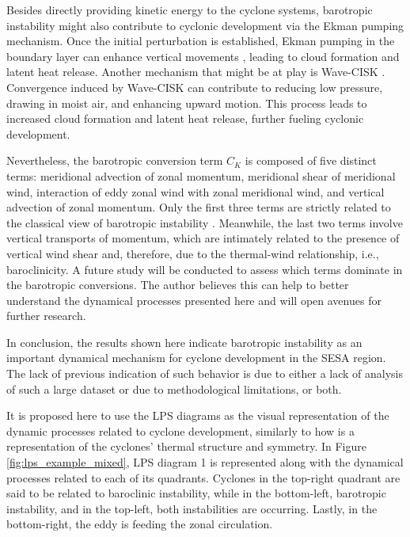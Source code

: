 Besides directly providing kinetic energy to the cyclone systems, barotropic instability might also contribute to cyclonic development via the Ekman pumping mechanism. Once the initial perturbation is established, Ekman pumping in the boundary layer can enhance vertical movements \citep[e.g.]{hamouda2019ekman}, leading to cloud formation and latent heat release. Another mechanism that might be at play is Wave-CISK \citep{lindzen1974wave,raymond1976wave}. Convergence induced by Wave-CISK can contribute to reducing low pressure, drawing in moist air, and enhancing upward motion. This process leads to increased cloud formation and latent heat release, further fueling cyclonic development.

Nevertheless, the barotropic conversion term $C_K$ is composed of five distinct terms: meridional advection of zonal momentum, meridional shear of meridional wind, interaction of eddy zonal wind with zonal meridional wind, and vertical advection of zonal momentum. Only the first three terms are strictly related to the classical view of barotropic instability \citep{rayleigh1895stability,kuo1949dynamic,holton1973introduction}. Meanwhile, the last two terms involve vertical transports of momentum, which are intimately related to the presence of vertical wind shear and, therefore, due to the thermal-wind relationship, i.e., baroclinicity. A future study will be conducted to assess which terms dominate in the barotropic conversions. The author believes this can help to better understand the dynamical processes presented here and will open avenues for further research.

In conclusion, the results shown here indicate barotropic instability as an important dynamical mechanism for cyclone development in the SESA region. The lack of previous indication of such behavior is due to either a lack of analysis of such a large dataset or due to methodological limitations, or both.

It is proposed here to use the LPS diagrams as the visual representation of the dynamic processes related to cyclone development, similarly to how \citet{hart2003cyclone} is a representation of the cyclones' thermal structure and symmetry. In Figure \ref{fig:lps_example_mixed}, LPS diagram 1 is represented along with the dynamical processes related to each of its quadrants. Cyclones in the top-right quadrant are said to be related to baroclinic instability, while in the bottom-left, barotropic instability, and in the top-left, both instabilities are occurring. Lastly, in the bottom-right, the eddy is feeding the zonal circulation.

